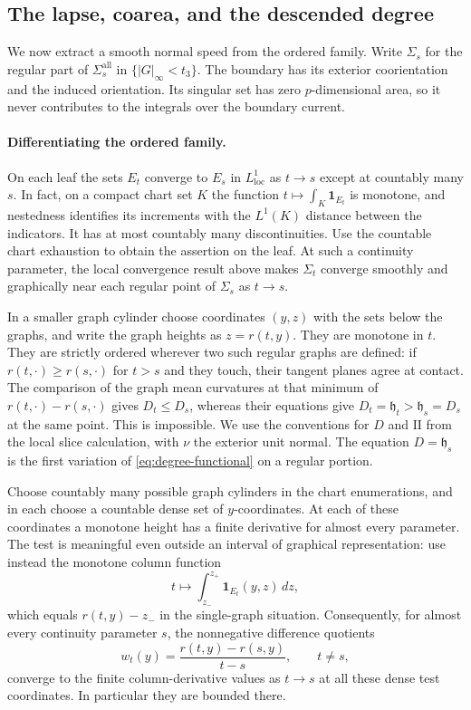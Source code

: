 \subsection{The lapse, coarea, and the descended degree}

We now extract a smooth normal speed from the ordered family.  Write
$\Sigma_s$ for the regular part of $\Sigma_s^{\mathrm{all}}$ in
$\{|G|_\infty<t_3\}$.  The boundary has its exterior coorientation and
the induced orientation.  Its singular set has zero $p$-dimensional area,
so it never contributes to the integrals over the boundary current.

\paragraph{Differentiating the ordered family.}
On each leaf the sets $E_t$ converge to $E_s$ in $L^1_{\mathrm{loc}}$ as
$t\to s$ except at countably many $s$.  In fact, on a compact chart set
$K$ the function $t\mapsto\int_K\mathbf1_{E_t}$ is monotone, and nestedness
identifies its increments with the $L^1(K)$ distance between the
indicators.  It has at most countably many discontinuities.  Use the
countable chart exhaustion to obtain the assertion on the leaf.
At such a continuity parameter, the local convergence result above makes
$\Sigma_t$ converge smoothly and graphically near each regular point of
$\Sigma_s$ as $t\to s$.

In a smaller graph cylinder choose coordinates $(y,z)$ with the sets
below the graphs, and write the graph heights as $z=r(t,y)$.  They are
monotone in $t$.  They are strictly ordered wherever two such regular
graphs are defined: if $r(t,\cdot)\ge r(s,\cdot)$ for $t>s$ and they touch,
their tangent planes agree at contact.  The comparison of the graph mean
curvatures at that minimum of $r(t,\cdot)-r(s,\cdot)$ gives
$D_t\le D_s$, whereas their equations give
$D_t=\mathfrak h_t>\mathfrak h_s=D_s$ at the same point.  This is
impossible.  We use the conventions for $D$ and $\mathrm{II}$ from the
local slice calculation, with $\nu$ the exterior unit normal.  The
equation $D=\mathfrak h_s$ is the first variation of
\eqref{eq:degree-functional} on a regular portion.

Choose countably many possible graph cylinders in the chart enumerations,
and in each choose a countable dense set of $y$-coordinates.  At each of
these coordinates a monotone height has a finite derivative for almost
every parameter.  The test is meaningful even outside an interval of
graphical representation: use instead the monotone column function
\[
          t\longmapsto\int_{z_-}^{z_+}\mathbf1_{E_t}(y,z)\,dz,
\]
which equals $r(t,y)-z_-$ in the single-graph situation.  Consequently,
for almost every continuity parameter $s$, the nonnegative difference
quotients
\[
          w_t(y)=\frac{r(t,y)-r(s,y)}{t-s},\qquad t\ne s,
\]
converge to the finite column-derivative values as $t\to s$ at all these
dense test coordinates.  In particular they are bounded there.

